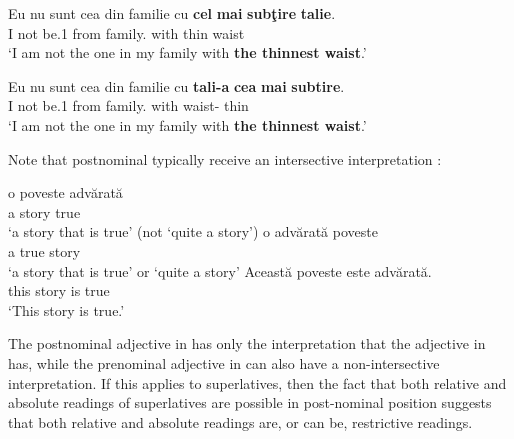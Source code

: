 \documentclass[output=paper
,modfonts
,nonflat]{langsci/langscibook}
\begin{document}
\ea \label{ex:coppockstrand:33}

\begin{xlist}

\ex \label{ex:coppockstrand:33a}
\gll Eu nu sunt cea din familie cu \textbf{cel} \textbf{mai} \textbf{subţire} \textbf{talie}.\\
I not be.1\sg{}  from family.\acc{} with  \cmpr{} thin waist\\
\glt `I am not the one in my family with \textbf{the thinnest waist}.'

\ex \label{ex:coppockstrand:33b}
\gll Eu nu sunt cea din familie cu \textbf{tali-a} \textbf{cea} \textbf{mai} \textbf{subtire}.\\
I not be.1\sg{}  from family.\acc{} with  waist-  \cmpr{} thin\\
\glt `I am not the one in my family with \textbf{the thinnest waist}.'
\end{xlist}
\z

Note that postnominal  typically receive an intersective interpretation \citep{Cornilescu1992,MarchisAlexadiou2009,Teodorescu2007}:

\ea \label{ex:coppockstrand:34}
\begin{xlist}
\ex \label{ex:coppockstrand:34a}
\gll o poveste advărată\\
a story true\\
\glt `a story that is true' (not `quite a story')
\ex \label{ex:coppockstrand:34bb}
\gll o advărată poveste\\
a true story\\
\glt `a story that is true' or `quite a story'\label{rom:prenominal-story}
\ex \label{ex:coppockstrand:34b}
\gll Această poveste este advărată.\\
this story is true\\
\glt `This story is true.'
\end{xlist}
\z

The postnominal adjective in  has only the interpretation that the adjective in  has, while the prenominal adjective in  can also have a non-intersective interpretation.
If this applies to superlatives, then the fact that both relative and absolute readings of superlatives are possible in post-nominal position suggests that both relative and absolute readings are, or can be, restrictive readings.
\end{document}
